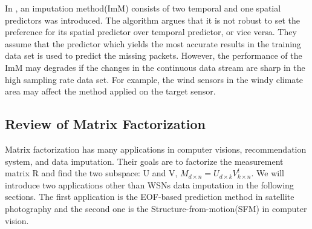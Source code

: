  In \cite{Lim:robust}, an imputation method(ImM) consists of two temporal and one spatial predictors was introduced.  The algorithm argues that it is not robust to set the preference for its spatial predictor over temporal predictor, or vice versa.
They assume that the predictor which yields the most accurate results in the training data set is used to predict the missing packets. 
However, the performance of the ImM may degrades if the changes in the continuous data stream are sharp in the high sampling rate data set. 
For example, the wind sensors in the windy climate area may affect the method applied on the target sensor.  
\subsection{Review of Matrix Factorization  }
Matrix factorization has many applications in computer visions, recommendation system\cite{chen2011linear}, and data imputation. Their goals are to factorize the measurement matrix R and find the two subspace: U and V, $M_{d\times n}= U_{d\times k}V^t_{k\times n}$. 
We will introduce two applications other than WSNs data imputation in the following sections. The first application is the EOF-based prediction method in satellite photography and the second one is the Structure-from-motion(SFM) in computer vision.

